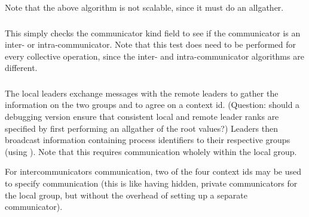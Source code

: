 \documentclass{article}
\begin{document}
Note that the above algorithm is not scalable, since it must do an 
allgather.  

\subsubsection{}


This simply checks the communicator kind field to see if the
communicator is an inter- or intra-communicator.
Note that this test does need to be performed for every collective operation,
since the inter- and intra-communicator algorithms are different.

\subsubsection{}
The local leaders exchange messages with the remote leaders to gather the
information on the two groups and to agree on a context id.  (Question: should
a debugging version ensure 
that consistent local and remote leader ranks are specified by first
performing an allgather of the root values?)  
Leaders then broadcast information containing process identifiers to
their respective groups (using 
). Note that this requires communication wholely
within the local group.  


For intercommunicators communication, two of the four context ids may
be used to specify communication (this is like having hidden, private
communicators for the local group, but without the overhead of setting
up a separate communicator). 
\end{document}
